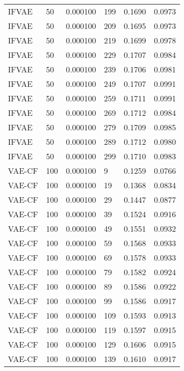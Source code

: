 \begin{tabular}{llrlrr}
   IFVAE &   50 &  0.000100 &   199 &  0.1690 &       0.0973 \\
   IFVAE &   50 &  0.000100 &   209 &  0.1695 &       0.0973 \\
   IFVAE &   50 &  0.000100 &   219 &  0.1699 &       0.0978 \\
   IFVAE &   50 &  0.000100 &   229 &  0.1707 &       0.0984 \\
   IFVAE &   50 &  0.000100 &   239 &  0.1706 &       0.0981 \\
   IFVAE &   50 &  0.000100 &   249 &  0.1707 &       0.0991 \\
   IFVAE &   50 &  0.000100 &   259 &  0.1711 &       0.0991 \\
   IFVAE &   50 &  0.000100 &   269 &  0.1712 &       0.0984 \\
   IFVAE &   50 &  0.000100 &   279 &  0.1709 &       0.0985 \\
   IFVAE &   50 &  0.000100 &   289 &  0.1712 &       0.0980 \\
   IFVAE &   50 &  0.000100 &   299 &  0.1710 &       0.0983 \\
  VAE-CF &  100 &  0.000100 &     9 &  0.1259 &       0.0766 \\
  VAE-CF &  100 &  0.000100 &    19 &  0.1368 &       0.0834 \\
  VAE-CF &  100 &  0.000100 &    29 &  0.1447 &       0.0877 \\
  VAE-CF &  100 &  0.000100 &    39 &  0.1524 &       0.0916 \\
  VAE-CF &  100 &  0.000100 &    49 &  0.1551 &       0.0932 \\
  VAE-CF &  100 &  0.000100 &    59 &  0.1568 &       0.0933 \\
  VAE-CF &  100 &  0.000100 &    69 &  0.1578 &       0.0933 \\
  VAE-CF &  100 &  0.000100 &    79 &  0.1582 &       0.0924 \\
  VAE-CF &  100 &  0.000100 &    89 &  0.1586 &       0.0922 \\
  VAE-CF &  100 &  0.000100 &    99 &  0.1586 &       0.0917 \\
  VAE-CF &  100 &  0.000100 &   109 &  0.1593 &       0.0913 \\
  VAE-CF &  100 &  0.000100 &   119 &  0.1597 &       0.0915 \\
  VAE-CF &  100 &  0.000100 &   129 &  0.1606 &       0.0915 \\
  VAE-CF &  100 &  0.000100 &   139 &  0.1610 &       0.0917 \\

\end{tabular}
